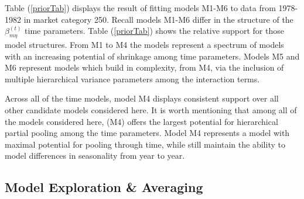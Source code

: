\documentclass[12pt]{article}
\begin{document}
Table (\ref{priorTab}) displays the result of fitting models M1-M6 to data
from 1978-1982 in market category 250. Recall models M1-M6 differ in the
structure of the \(\beta^{(t)}_{m\eta}\) time parameters.
Table (\ref{priorTab}) shows the relative support for those model
structures. From M1 to M4 the models represent a spectrum of models with
an increasing potential of shrinkage among time parameters. Models M5
and M6 represent models which build in complexity, from M4, via the
inclusion of multiple hierarchical variance parameters among the
interaction terms.

Across all of the time models, model M4 displays consistent support over
all other candidate models considered here. It is worth mentioning that
among all of the models considered here, (M4) offers the largest
potential for hierarchical partial pooling among the time parameters.
Model M4 represents a model with maximal potential for pooling through
time, while still maintain the ability to model differences in
seasonality from year to year.

\subsection{Model Exploration \&
Averaging}\label{model-exploration-averaging-1}

\end{document}
